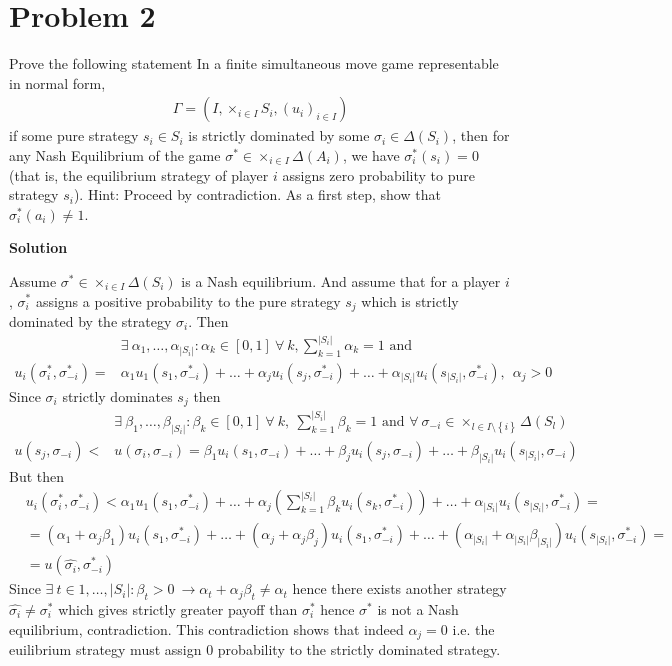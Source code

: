 \documentclass[a4paper]{article}
\begin{document}
\section*{Problem 2}
Prove the following statement
In a finite simultaneous move game representable in normal form,
\begin{align*}
\Gamma = (I, \times_{i \in I}S_i, (u_i)_{i \in I})
\end{align*}
if some pure strategy $s_i \in S_i$
is strictly dominated by some $\sigma_i \in \Delta(S_i)$, then
for any Nash Equilibrium of the game $\sigma^* \in \times_{i \in I}\Delta(A_i)$, we have $\sigma^*_i(s_i) = 0$
(that is, the equilibrium strategy of player $i$ assigns zero probability to pure
strategy $s_i$).
Hint: Proceed by contradiction. As a first step, show that $\sigma^*_i
(a_i) \neq 1$.


\textbf{Solution}

Assume $\sigma^* \in \times_{i \in I}\Delta(S_i)$ is a Nash equilibrium. And assume that for a player $i$, $\sigma_i^*$ assigns a positive probability to the pure strategy $s_j$ which is strictly dominated by the strategy $\sigma_i$. Then 
\begin{align*}
&\exists\ \alpha_1, \dots, \alpha_{|S_i|}: \alpha_k \in [0, 1]\ \forall\ k, \sum_{k=1}^{|S_i|}\alpha_k = 1\text{ and }\\
 u_i(\sigma^*_i, \sigma^*_{-i}) = &\alpha_1 u_1(s_1, \sigma^*_{-i}) + \dots + \alpha_j u_i(s_j, \sigma^*_{-i}) + \dots + \alpha_{|S_i|}u_i(s_{|S_i|}, \sigma^*_{-i}),\ \  \alpha_j > 0
\end{align*}
Since $\sigma_i$ strictly dominates $s_j$ then
\begin{align*}
&\exists\ \beta_1, \dots, \beta_{|S_i|}:\beta_k \in [0, 1]\ \forall\ k,\ \sum_{k=1}^{|S_i|}\beta_k = 1\text{ and }
\forall\ \sigma_{-i} \in \times_{l \in I\setminus \left\{i\right\}}\Delta(S_l)\\
u(s_j, \sigma_{-i}) < &u(\sigma_i, \sigma_{-i}) = \beta_1 u_i(s_1, \sigma_{-i}) + \dots + \beta_j u_i(s_j, \sigma_{-i}) + \dots + \beta_{|S_i|}u_i(s_{|S_i|}, \sigma_{-i})
\end{align*}
But then
\begin{align*}
&u_i(\sigma_i^*, \sigma^*_{-i}) < \alpha_1u_1(s_1, \sigma^*_{-i}) + \dots + \alpha_j \left(\sum_{k=1}^{|S_i|}\beta_k u_i(s_k, \sigma^*_{-i})\right) + \dots + \alpha_{|S_i|}u_i(s_{|S_i|}, \sigma^*_{-i}) = \\
&= (\alpha_1 + \alpha_j\beta_1)u_i(s_1, \sigma^*_{-i}) + \dots + (\alpha_j + \alpha_j\beta_j)u_i(s_1, \sigma^*_{-i}) + \dots + (\alpha_{|S_i|} + \alpha_{|S_i|}\beta_{|S_i|})u_i(s_{|S_i|}, \sigma^*_{-i}) = \\
&=u(\hat{\sigma_i}, \sigma^*_{-i})
\end{align*}
Since $\exists\ t \in 1, \dots, |S_i|: \beta_{t} > 0\ \to \alpha_t + \alpha_j \beta_t \neq \alpha_t$ hence there exists another strategy $\hat{\sigma_i} \neq \sigma^*_i$ which gives strictly greater payoff than $\sigma^*_i$ hence $\sigma^*$ is not a Nash equilibrium, contradiction. This contradiction shows that indeed $\alpha_j = 0$ i.e. the euilibrium strategy must assign $0$ probability to the strictly dominated strategy.
\end{document}
